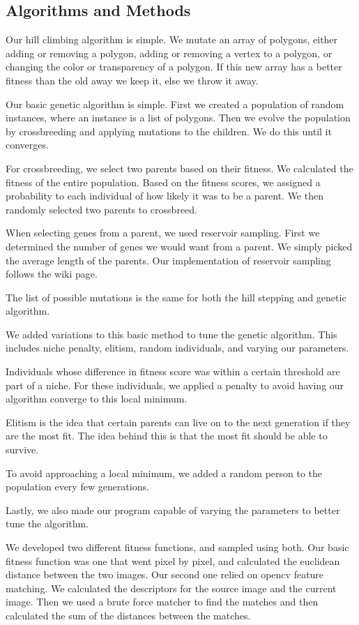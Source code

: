 \documentclass[12pt,letterpaper]{article}
\begin{document}
\subsection{Algorithms and Methods}
Our hill climbing algorithm is simple. We mutate an array of polygons, either adding or removing a polygon, adding or removing a vertex to a polygon, or changing the color or transparency of a polygon. If this new array has a better fitness than the old away we keep it, else we throw it away.

Our basic genetic algorithm is simple. First we created a population of random instances, where an instance is a list of polygons.  Then we evolve the population by crossbreeding and applying mutations to the children.  We do this until it converges.

For crossbreeding, we select two parents based on their fitness.  We calculated the fitness of the entire population.  Based on the fitness scores, we assigned a probability to each individual of how likely it was to be a parent.  We then randomly selected two parents to crossbreed.

When selecting genes from a parent, we used reservoir sampling.  First we determined the number of genes we would want from a parent.  We simply picked the average length of the parents.  Our implementation of reservoir sampling follows the wiki page.

The list of possible mutations is the same for both the hill stepping and genetic algorithm.

We added variations to this basic method to tune the genetic algorithm. This includes niche penalty, elitism, random individuals, and varying our parameters.

Individuals whose difference in fitness score was within a certain threshold are part of a niche.  For these individuals, we applied a penalty to avoid having our algorithm converge to this local minimum.

Elitism is the idea that certain parents can live on to the next generation if they are the most fit.  The idea behind this is that the most fit should be able to survive.

To avoid approaching a local minimum, we added a random person to the population every few generations.

Lastly, we also made our program capable of varying the parameters to better tune the algorithm.

We developed two different fitness functions, and sampled using both. Our basic fitness function was one that went pixel by pixel, and calculated the euclidean distance between the two images. Our second one relied on opencv feature matching. We calculated the descriptors for the source image and the current image.  Then we used a brute force matcher to find the matches and then calculated the sum of the distances between the matches.
\end{document}
